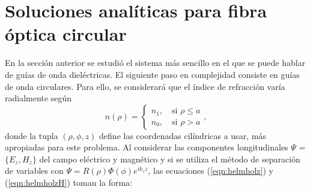 \section{Soluciones analíticas para fibra óptica circular}
En la sección anterior se estudió el sistema más sencillo en el que se puede hablar de guías de onda dieléctricas. El siguiente paso en complejidad consiste en guías de onda circulares. Para ello, se considerará que el índice de refracción varía radialmente según 
\begin{equation}
	n( \rho ) = 
	\left\{\begin{matrix}
	n_1, \quad \text{si } \rho \le a
	\\
	n_0, \quad \text{si } \rho > a
	\end{matrix}\right.
	,\nonumber
\end{equation}
donde la tupla $(\rho, \phi, z)$ define las coordenadas cilíndricas a usar, más apropiadas para este problema. 
Al considerar las componentes longitudinales $\Psi$ = $\{E_z, H_z\}$ del campo eléctrico y magnético y  si se utiliza el método de separación de variables con $\Psi =  R(\rho)\Phi(\phi) e^{ik_z z} $,  las ecuaciones (\ref{eqn:helmholz}) y (\ref{eqn:helmholzH}) toman la forma:

